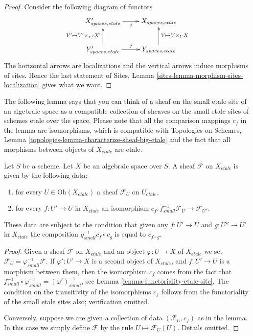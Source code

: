 \begin{proof}
Consider the following diagram of functors
$$
\xymatrix{
X'_{spaces, etale} \ar[r]_j &
X_{spaces, etale} \\
Y'_{spaces, etale} \ar[r]^j \ar[u]^{V' \mapsto V' \times_{Y'} X'} &
Y_{spaces, etale} \ar[u]_{V \mapsto V \times_Y X}
}
$$
The horizontal arrows are localizations and the vertical arrows induce
morphisms of sites. Hence the last statement of
Sites, Lemma \ref{sites-lemma-morphism-sites-localization}
gives what we want.
\end{proof}

\noindent
The following lemma says that you can think of a sheaf on the small
etale site of an algebraic space as a compatible collection of sheaves
on the small etale sites of schemes etale over the space. Please note
that all the comparison mappings $c_f$ in the lemma are isomorphisms,
which is compatible with
Topologies on Schemes,
Lemma \ref{topologies-lemma-characterize-sheaf-big-etale}
and the fact that all morphisms between objects of $X_{etale}$
are etale.

\begin{lemma}
\label{lemma-characterize-sheaf-small-etale}
Let $S$ be a scheme. Let $X$ be an algebraic space over $S$.
A sheaf $\mathcal{F}$ on $X_{etale}$ is given by the following data:
\begin{enumerate}
\item for every $U \in \text{Ob}(X_{etale})$ a sheaf
$\mathcal{F}_U$ on $U_{etale}$,
\item for every $f : U' \to U$ in $X_{etale}$ an isomorphism
$c_f : f_{small}^{-1}\mathcal{F}_U \to \mathcal{F}_{U'}$.
\end{enumerate}
These data are subject to the condition that given any $f : U' \to U$
and $g : U'' \to U'$ in $X_{etale}$ the composition
$g_{small}^{-1}c_f \circ c_g$ is equal to $c_{f \circ g}$.
\end{lemma}

\begin{proof}
Given a sheaf $\mathcal{F}$ on $X_{etale}$ and an object
$\varphi : U \to X$ of
$X_{etale}$ we set $\mathcal{F}_U = \varphi_{small}^{-1}\mathcal{F}$.
If $\varphi' : U' \to X$ is a second object of $X_{etale}$, and
$f : U' \to U$ is a morphism between them, then
the isomorphism $c_f$ comes from the fact that
$f_{small}^{-1} \circ \varphi_{small}^{-1} = (\varphi')^{-1}_{small}$, see
Lemma \ref{lemma-functoriality-etale-site}. The condition on the
transitivity of the isomorphisms $c_f$ follows from the functoriality
of the small etale sites also; verification omitted.

\medskip\noindent
Conversely, suppose we are given a collection of data $(\mathcal{F}_U, c_f)$
as in the lemma. In this case we simply define $\mathcal{F}$ by the rule
$U \mapsto \mathcal{F}_U(U)$. Details omitted.
\end{proof}









